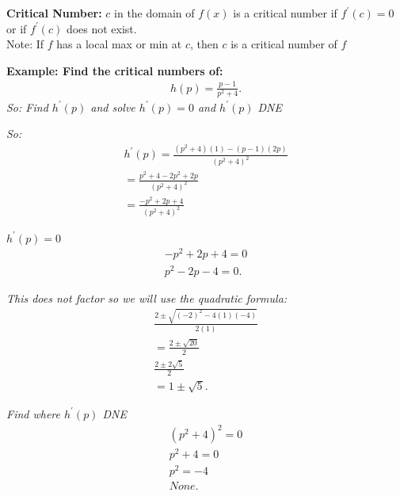 \documentclass{report}
\begin{document}
    \smallbreak \noindent
    \begin{mdframed}
      \textbf{Critical Number:}
      $c$ in the domain of $f(x)$ is a critical number if $f^{\prime}(c)=0$ or if $f^{\prime}(c)$ does not exist. \\
      Note: If $f$ has a local max or min at $c$, then $c$ is a critical number of $f$ 
    \end{mdframed}

    \pagebreak \bigbreak \noindent
    \begin{mdframed}
      \textbf{Example: Find the critical numbers of:}
      \begin{align*}
        h(p) = \frac{p-1}{p^{2}+4}
      .\end{align*}
      \textit{So: Find $h^{\prime}(p)$ and solve $h^{\prime}(p)=0$ and $h^{\prime}(p)$ DNE}
    \end{mdframed}

    \bigbreak \noindent
    \textit{So:}
    \begin{align*}
      h^{\prime}(p) = \frac{(p^{2}+4)(1) - (p-1)(2p)}{(p^{2}+4)^{2}} \\
      = \frac{p^{2}+4-2p^{2}+2p}{(p^{2}+4)^{2}} \\
      = \boxed{\frac{-p^{2}+2p+4}{(p^{2}+4)^{2}}}
    \end{align*}

    \bigbreak \noindent 
    \textit{$h^{\prime}(p)= 0$}
    \begin{align*}
      -p^{2} + 2p + 4 = 0 \\
      p^{2}-2p-4 =0 
    .\end{align*}

    \bigbreak \noindent 
    \textit{This does not factor so we will use the quadratic formula:}
    \begin{align*}
      \frac{2\pm \sqrt{(-2)^{2} -4(1)(-4)}}{2(1)} \\
      = \frac{2 \pm \sqrt{20}}{2} \\
      \frac{2\pm 2 \sqrt{5}}{2} \\ 
      = \boxed{1\pm \sqrt{5}}
    .\end{align*}

    \bigbreak \noindent 
    \textit{Find where $h^{\prime}(p)$ DNE}
    \begin{align*}
      (p^{2} +4)^{2} = 0 \\
      p^{2} + 4 = 0 \\
      p^{2} = -4 \\
      \boxed{None}
    .\end{align*}
\end{document}
